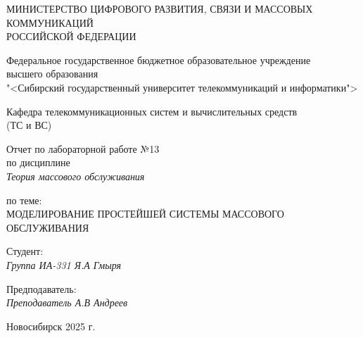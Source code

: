 \thispagestyle{empty}

\begin{center}
    МИНИСТЕРСТВО ЦИФРОВОГО РАЗВИТИЯ, СВЯЗИ И МАССОВЫХ КОММУНИКАЦИЙ \\ РОССИЙСКОЙ ФЕДЕРАЦИИ

    \vspace{20pt}

    Федеральное государственное бюджетное образовательное учреждение  \\  высшего образования \\
    "<Сибирский государственный университет телекоммуникаций и информатики"> \\

    \vspace{20pt}

    Кафедра телекоммуникационных систем и вычислительных средств \\  (ТС и ВС)
\end{center}

\vfill

\begin{center}
    Отчет по лабораторной работе №13 \\  
    по дисциплине \\
    \textit{Теория массового обслуживания}

    \vspace{20pt} 
    по теме: \\
    \uppercase{Моделирование простейшей системы массового обслуживания}
\end{center}

\vfill

    \noindent Студент: \\
    \textit{Группа ИА-331 \hfill Я.А Гмыря}

    \vspace{20pt}

    \noindent Предподаватель: \\
    \textit{Преподаватель \hfill А.В Андреев}

\vfill

\begin{center}
    Новосибирск 2025 г.
\end{center}